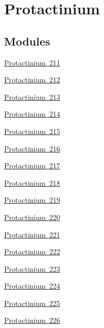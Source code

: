 \hypertarget{group___isotope_const-_protactinium}{}\section{Protactinium}
\label{group___isotope_const-_protactinium}
\subsection*{Modules}
\begin{DoxyCompactItemize}
\item 
\mbox{\hyperlink{group___isotope_const-_protactinium-_pa211}{Protactinium 211}}
\item 
\mbox{\hyperlink{group___isotope_const-_protactinium-_pa212}{Protactinium 212}}
\item 
\mbox{\hyperlink{group___isotope_const-_protactinium-_pa213}{Protactinium 213}}
\item 
\mbox{\hyperlink{group___isotope_const-_protactinium-_pa214}{Protactinium 214}}
\item 
\mbox{\hyperlink{group___isotope_const-_protactinium-_pa215}{Protactinium 215}}
\item 
\mbox{\hyperlink{group___isotope_const-_protactinium-_pa216}{Protactinium 216}}
\item 
\mbox{\hyperlink{group___isotope_const-_protactinium-_pa217}{Protactinium 217}}
\item 
\mbox{\hyperlink{group___isotope_const-_protactinium-_pa218}{Protactinium 218}}
\item 
\mbox{\hyperlink{group___isotope_const-_protactinium-_pa219}{Protactinium 219}}
\item 
\mbox{\hyperlink{group___isotope_const-_protactinium-_pa220}{Protactinium 220}}
\item 
\mbox{\hyperlink{group___isotope_const-_protactinium-_pa221}{Protactinium 221}}
\item 
\mbox{\hyperlink{group___isotope_const-_protactinium-_pa222}{Protactinium 222}}
\item 
\mbox{\hyperlink{group___isotope_const-_protactinium-_pa223}{Protactinium 223}}
\item 
\mbox{\hyperlink{group___isotope_const-_protactinium-_pa224}{Protactinium 224}}
\item 
\mbox{\hyperlink{group___isotope_const-_protactinium-_pa225}{Protactinium 225}}
\item 
\mbox{\hyperlink{group___isotope_const-_protactinium-_pa226}{Protactinium 226}}
\item 

\end{DoxyCompactItemize}
